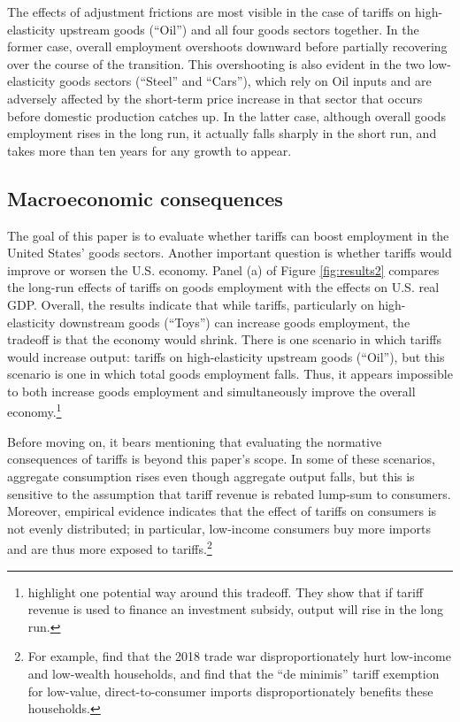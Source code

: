 \documentclass[12pt]{article}
\begin{document}
The effects of adjustment frictions are most visible in the case of tariffs on high-elasticity upstream goods (``Oil'') and all four goods sectors together. In the former case, overall employment overshoots downward before partially recovering over the course of the transition. This overshooting is also evident in the two low-elasticity goods sectors (``Steel'' and ``Cars''), which rely on Oil inputs and are adversely affected by the short-term price increase in that sector that occurs before domestic production catches up. In the latter case, although overall goods employment rises in the long run, it actually falls sharply in the short run, and takes more than ten years for any growth to appear.

\subsection{Macroeconomic consequences}
The goal of this paper is to evaluate whether tariffs can boost employment in the United States' goods sectors. Another important question is whether tariffs would improve or worsen the U.S. economy. Panel (a) of Figure \ref{fig:results2} compares the long-run effects of tariffs on goods employment with the effects on U.S. real GDP. Overall, the results indicate that while tariffs, particularly on high-elasticity downstream goods (``Toys'') can increase goods employment, the tradeoff is that the economy would shrink. There is one scenario in which tariffs would increase output: tariffs on high-elasticity upstream goods (``Oil''), but this scenario is one in which total goods employment falls. Thus, it appears impossible to both increase goods employment and simultaneously improve the overall economy.\footnote{\citet{taxcut} highlight one potential way around this tradeoff. They show that if tariff revenue is used to finance an investment subsidy, output will rise in the long run.} 

Before moving on, it bears mentioning that evaluating the normative consequences of tariffs is beyond this paper's scope. In some of these scenarios, aggregate consumption rises even though aggregate output falls, but this is sensitive to the assumption that tariff revenue is rebated lump-sum to consumers. Moreover, empirical evidence indicates that the effect of tariffs on consumers is not evenly distributed; in particular, low-income consumers buy more imports and are thus more exposed to tariffs.\footnote{For example, \citet{carroll-hur} find that the 2018 trade war disproportionately hurt low-income and low-wealth households, and \citet{de-minimus} find that the ``de minimis'' tariff exemption for low-value, direct-to-consumer imports disproportionately benefits these households.}
\end{document}
